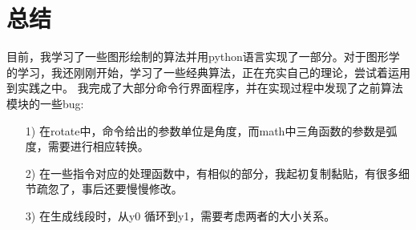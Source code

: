 \documentclass[a4paper,UTF8]{article}
\theoremstyle{definition}
\begin{document}
\section{总结}
目前，我学习了一些图形绘制的算法并用python语言实现了一部分。对于图形学的学习，我还刚刚开始，学习了一些经典算法，正在充实自己的理论，尝试着运用到实践之中。
我完成了大部分命令行界面程序，并在实现过程中发现了之前算法模块的一些bug:
\begin{itemize}
    \item [1)]
    在rotate中，命令给出的参数单位是角度，而math中三角函数的参数是弧度，需要进行相应转换。
    \item [2)]
    在一些指令对应的处理函数中，有相似的部分，我起初复制黏贴，有很多细节疏忽了，事后还要慢慢修改。
    \item [3)]
    在生成线段时，从y0
    循环到y1，需要考虑两者的大小关系。
\end{itemize}

%



%
%
\end{document}
